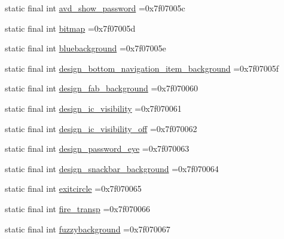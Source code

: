 \begin{DoxyCompactItemize}
\item 
static final int \mbox{\hyperlink{classcom_1_1example_1_1trainawearapplication_1_1_r_1_1drawable_a4b73304b5c3523a8441db3096789ba94}{avd\+\_\+show\+\_\+password}} =0x7f07005c
\item 
static final int \mbox{\hyperlink{classcom_1_1example_1_1trainawearapplication_1_1_r_1_1drawable_a9a389d2500a97e5ff47938d6b4850cf0}{bitmap}} =0x7f07005d
\item 
static final int \mbox{\hyperlink{classcom_1_1example_1_1trainawearapplication_1_1_r_1_1drawable_ac795a7bbc04f0e37c0d85ba022992118}{bluebackground}} =0x7f07005e
\item 
static final int \mbox{\hyperlink{classcom_1_1example_1_1trainawearapplication_1_1_r_1_1drawable_a62f5f47a5ef164747fc88bf06947e27d}{design\+\_\+bottom\+\_\+navigation\+\_\+item\+\_\+background}} =0x7f07005f
\item 
static final int \mbox{\hyperlink{classcom_1_1example_1_1trainawearapplication_1_1_r_1_1drawable_ab2ee2fb2a1f4d388dba97ffeda203ab7}{design\+\_\+fab\+\_\+background}} =0x7f070060
\item 
static final int \mbox{\hyperlink{classcom_1_1example_1_1trainawearapplication_1_1_r_1_1drawable_a0c14762f81faff3dc9f1818ca53fc48e}{design\+\_\+ic\+\_\+visibility}} =0x7f070061
\item 
static final int \mbox{\hyperlink{classcom_1_1example_1_1trainawearapplication_1_1_r_1_1drawable_a53d8b4c8801a4fd4965927b75644211c}{design\+\_\+ic\+\_\+visibility\+\_\+off}} =0x7f070062
\item 
static final int \mbox{\hyperlink{classcom_1_1example_1_1trainawearapplication_1_1_r_1_1drawable_a2e4720549de2dc9723aeb55687dd5cfc}{design\+\_\+password\+\_\+eye}} =0x7f070063
\item 
static final int \mbox{\hyperlink{classcom_1_1example_1_1trainawearapplication_1_1_r_1_1drawable_a24bab4d04c2e1433d95235f86042b831}{design\+\_\+snackbar\+\_\+background}} =0x7f070064
\item 
static final int \mbox{\hyperlink{classcom_1_1example_1_1trainawearapplication_1_1_r_1_1drawable_a70205daab4c2b303f0cbbe54d7548354}{exitcircle}} =0x7f070065
\item 
static final int \mbox{\hyperlink{classcom_1_1example_1_1trainawearapplication_1_1_r_1_1drawable_a45aa206472e5208ac27921cf15822cdd}{fire\+\_\+transp}} =0x7f070066
\item 
static final int \mbox{\hyperlink{classcom_1_1example_1_1trainawearapplication_1_1_r_1_1drawable_a4397b3317cacf71d56b072c398e0c918}{fuzzybackground}} =0x7f070067

\end{DoxyCompactItemize}
